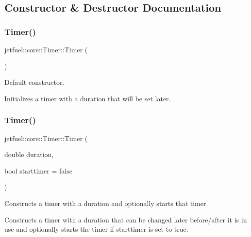 \subsection{Constructor \& Destructor Documentation}
\mbox{\label{classjetfuel_1_1core_1_1Timer_ac27fee7c9a0acbdbe7650b087ec26a7b}} 
\subsubsection{\texorpdfstring{Timer()}{Timer()}\hspace{0.1cm}{\footnotesize\ttfamily [1/2]}}
{\footnotesize\ttfamily jetfuel\+::core\+::\+Timer\+::\+Timer (\begin{DoxyParamCaption}{ }\end{DoxyParamCaption})\hspace{0.3cm}{\ttfamily [inline]}}



Default constructor. 

Initializes a timer with a duration that will be set later. \mbox{\label{classjetfuel_1_1core_1_1Timer_ad856b1bc0f24893dafd8c608831adcf9}} 
\subsubsection{\texorpdfstring{Timer()}{Timer()}\hspace{0.1cm}{\footnotesize\ttfamily [2/2]}}
{\footnotesize\ttfamily jetfuel\+::core\+::\+Timer\+::\+Timer (\begin{DoxyParamCaption}\item[{double}]{duration,  }\item[{bool}]{starttimer = {\ttfamily false} }\end{DoxyParamCaption})\hspace{0.3cm}{\ttfamily [inline]}}



Constructs a timer with a duration and optionally starts that timer. 

Constructs a timer with a duration that can be changed later before/after it is in use and optionally starts the timer if starttimer is set to true.


